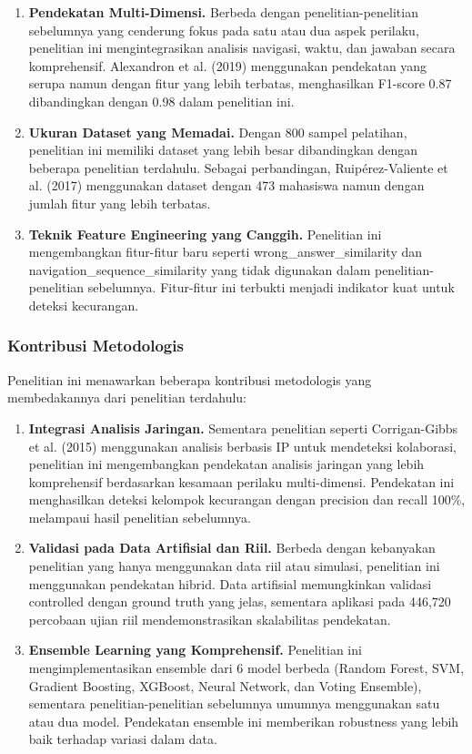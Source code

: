 \begin{enumerate}
    \item \textbf{Pendekatan Multi-Dimensi.} Berbeda dengan penelitian-penelitian sebelumnya yang cenderung fokus pada satu atau dua aspek perilaku, penelitian ini mengintegrasikan analisis navigasi, waktu, dan jawaban secara komprehensif. Alexandron et al. (2019) menggunakan pendekatan yang serupa namun dengan fitur yang lebih terbatas, menghasilkan F1-score 0.87 dibandingkan dengan 0.98 dalam penelitian ini.
    
    \item \textbf{Ukuran Dataset yang Memadai.} Dengan 800 sampel pelatihan, penelitian ini memiliki dataset yang lebih besar dibandingkan dengan beberapa penelitian terdahulu. Sebagai perbandingan, Ruipérez-Valiente et al. (2017) menggunakan dataset dengan 473 mahasiswa namun dengan jumlah fitur yang lebih terbatas.
    
    \item \textbf{Teknik Feature Engineering yang Canggih.} Penelitian ini mengembangkan fitur-fitur baru seperti wrong\_answer\_similarity dan navigation\_sequence\_similarity yang tidak digunakan dalam penelitian-penelitian sebelumnya. Fitur-fitur ini terbukti menjadi indikator kuat untuk deteksi kecurangan.
\end{enumerate}

\subsubsection{Kontribusi Metodologis}

Penelitian ini menawarkan beberapa kontribusi metodologis yang membedakannya dari penelitian terdahulu:

\begin{enumerate}
    \item \textbf{Integrasi Analisis Jaringan.} Sementara penelitian seperti Corrigan-Gibbs et al. (2015) menggunakan analisis berbasis IP untuk mendeteksi kolaborasi, penelitian ini mengembangkan pendekatan analisis jaringan yang lebih komprehensif berdasarkan kesamaan perilaku multi-dimensi. Pendekatan ini menghasilkan deteksi kelompok kecurangan dengan precision dan recall 100\%, melampaui hasil penelitian sebelumnya.
    
    \item \textbf{Validasi pada Data Artifisial dan Riil.} Berbeda dengan kebanyakan penelitian yang hanya menggunakan data riil atau simulasi, penelitian ini menggunakan pendekatan hibrid. Data artifisial memungkinkan validasi controlled dengan ground truth yang jelas, sementara aplikasi pada 446,720 percobaan ujian riil mendemonstrasikan skalabilitas pendekatan.
    
    \item \textbf{Ensemble Learning yang Komprehensif.} Penelitian ini mengimplementasikan ensemble dari 6 model berbeda (Random Forest, SVM, Gradient Boosting, XGBoost, Neural Network, dan Voting Ensemble), sementara penelitian-penelitian sebelumnya umumnya menggunakan satu atau dua model. Pendekatan ensemble ini memberikan robustness yang lebih baik terhadap variasi dalam data.
\end{enumerate}

